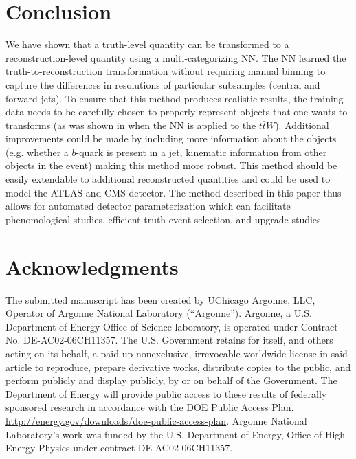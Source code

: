 \documentclass[showpacs,showkeys,preprint,prd,nofootinbib,linenumbers,12pt,superscriptaddress]{revtex4-1}
\begin{document}

\section{Conclusion}

We have shown that a truth-level quantity can be transformed to a reconstruction-level quantity using a multi-categorizing NN. The NN learned the truth-to-reconstruction transformation without requiring manual binning to capture the differences in resolutions of particular subsamples (central and forward jets). To ensure that this method produces realistic results, the training data needs to be carefully chosen to properly represent objects that one wants to transforms (as was shown in when the NN is applied to the $t\bar{t} W$). Additional improvements could be made by including more information about the objects (e.g. whether a $b$-quark is present in a jet, kinematic information from other objects in the event) making this method more robust. This method should be easily extendable to additional reconstructed quantities and could be used to model the ATLAS and CMS detector. The method described in this paper thus allows for automated detector parameterization which can facilitate phenomological studies, efficient truth event selection, and upgrade studies.

\section*{Acknowledgments}
The submitted manuscript has been created by UChicago Argonne, LLC, Operator of Argonne National Laboratory (“Argonne”). Argonne, a U.S.  Department of Energy Office of Science laboratory, is operated under Contract No. DE-AC02-06CH11357. The U.S. Government retains for itself, 
and others acting on its behalf, a paid-up nonexclusive, irrevocable worldwide license in said article to reproduce, prepare derivative works, distribute copies to the public, and perform publicly and display publicly, by or on behalf of the Government.  The Department of Energy will provide public access to these results of federally sponsored research in accordance with the 
DOE Public Access Plan. \url{http://energy.gov/downloads/doe-public-access-plan}. Argonne National Laboratory’s work was funded by the U.S. Department of Energy, Office of High Energy Physics under contract DE-AC02-06CH11357. 



\end{document}
